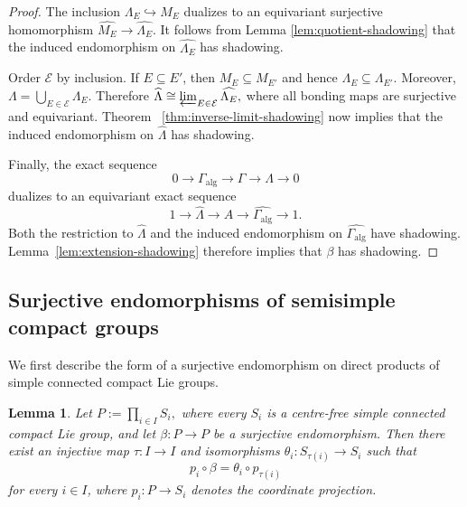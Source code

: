 \documentclass[12pt]{amsart}
\newtheorem{lemma}[theorem]{Lemma}
\theoremstyle{definition}
\numberwithin{equation}{section}
\theoremstyle{remark}
\begin{document}
\begin{proof}
The inclusion $\Lambda_E\hookrightarrow M_E$ dualizes to an
equivariant surjective homomorphism
$\widehat{M_E}\to\widehat{\Lambda_E}$. It follows from Lemma \ref{lem:quotient-shadowing} that the induced
endomorphism on $\widehat{\Lambda_E}$ has shadowing.



Order $\mathcal E$ by inclusion. If $E\subseteq E'$, then
$M_E\subseteq M_{E'}$ and hence
$\Lambda_E\subseteq\Lambda_{E'}$. Moreover,
$
\Lambda=\bigcup_{E\in\mathcal E}\Lambda_E.
$
Therefore
$
\widehat\Lambda
\cong
\varprojlim_{E\in\mathcal E}\widehat{\Lambda_E},
$
where all bonding maps are surjective and equivariant. Theorem~
\ref{thm:inverse-limit-shadowing} now implies that the induced
endomorphism on $\widehat\Lambda$ has shadowing.

Finally, the exact sequence
\[
0\longrightarrow\Gamma_{\mathrm{alg}}
\longrightarrow\Gamma
\longrightarrow\Lambda
\longrightarrow 0
\]
dualizes to an equivariant exact sequence
\[
1\longrightarrow\widehat\Lambda
\longrightarrow A
\longrightarrow\widehat{\Gamma_{\mathrm{alg}}}
\longrightarrow 1.
\]
Both the restriction to $\widehat\Lambda$ and the induced
endomorphism on $\widehat{\Gamma_{\mathrm{alg}}}$ have shadowing.
Lemma~\ref{lem:extension-shadowing} therefore implies that $\beta$ has
shadowing.
\end{proof}



\subsection{Surjective endomorphisms of semisimple compact groups}


We first describe the form of a surjective endomorphism on direct products of simple connected compact Lie groups.

\begin{lemma}\label{lem:semisimple-index-map}
Let
$
P:=\prod_{i\in I}S_i,
$
where every $S_i$ is a centre-free simple connected compact Lie group,
and let $\beta:P\to P$ be a surjective endomorphism. Then there exist
an injective map $\tau:I\to I$ and isomorphisms
$\theta_i:S_{\tau(i)}\to S_i$ such that
\begin{equation}\label{eq:coordinate-endo}
p_i\circ\beta=\theta_i\circ p_{\tau(i)}
\end{equation}
for every $i\in I$, where $p_i:P\to S_i$ denotes the coordinate
projection.
\end{lemma}
\end{document}
